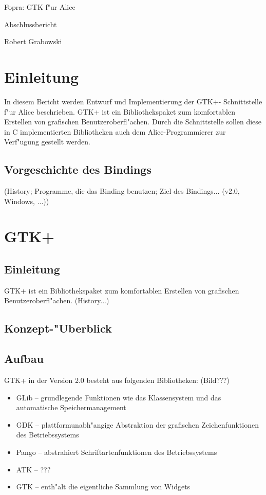 \documentclass{article}
\begin{document}
\begin{center}
\begin{huge}Fopra: GTK f"ur Alice\end{huge}

Abschlussbericht

Robert Grabowski

\end{center}

\section{Einleitung}

In diesem Bericht werden Entwurf und Implementierung der GTK+-
Schnittstelle f"ur Alice beschrieben. GTK+ ist ein Bibliothekspaket zum
komfortablen Erstellen von grafischen Benutzeroberfl"achen.
Durch die Schnittstelle sollen diese in C implementierten Bibliotheken
auch dem Alice-Programmierer zur Verf"ugung gestellt werden.

\subsection{Vorgeschichte des Bindings}

(History; Programme, die das Binding benutzen; Ziel des Bindings... 
(v2.0, Windows, ...))

\section{GTK+}

\subsection{Einleitung}

GTK+ ist ein Bibliothekspaket zum komfortablen Erstellen von grafischen
Benutzeroberfl"achen. (History...) 

\subsection{Konzept-"Uberblick}

\subsection{Aufbau}

GTK+ in der Version 2.0 besteht aus folgenden Bibliotheken: (Bild???)

\begin{itemize}
\item GLib -- grundlegende Funktionen wie das Klassensystem und
      das automatische Speichermanagement
\item GDK -- plattformunabh"angige Abstraktion der grafischen
      Zeichenfunktionen des Betriebssystems
\item Pango -- abstrahiert Schriftartenfunktionen des Betriebssystems
\item ATK -- ???
\item GTK -- enth"alt die eigentliche Sammlung von Widgets
\end{itemize}
\end{document}

